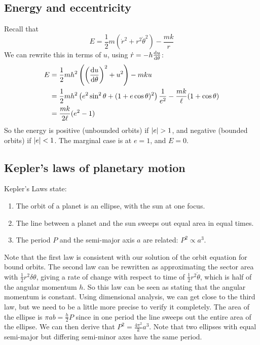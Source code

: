 \subsection{Energy and eccentricity}
Recall that
\[
	E = \frac{1}{2}m\left( \dot r^2 + r^2 \dot\theta^2 \right) - \frac{mk}{r}
\]
We can rewrite this in terms of \(u\), using \(\dot r = -h\dv{u}{\theta}\):
\begin{align*}
	E & = \frac{1}{2}mh^2\left( \left( \dv{u}{\theta} \right)^2 + u^2 \right) - mku                                      \\
	  & = \frac{1}{2}mh^2\left( e^2\sin^2\theta + (1+e\cos\theta)^2 \right)\frac{1}{e^2} - \frac{mk}{\ell}(1+\cos\theta) \\
	  & = \frac{mk}{2\ell}(e^2 - 1)
\end{align*}
So the energy is positive (unbounded orbits) if \(\abs{e} > 1\), and negative (bounded orbits) if \(\abs{e} < 1\).
The marginal case is at \(e = 1\), and \(E = 0\).

\subsection{Kepler's laws of planetary motion}
Kepler's Laws state:
\begin{enumerate}
	\item The orbit of a planet is an ellipse, with the sun at one focus.
	\item The line between a planet and the sun sweeps out equal area in equal times.
	\item The period \(P\) and the semi-major axis \(a\) are related: \(P^2 \propto a^3\).
\end{enumerate}
Note that the first law is consistent with our solution of the orbit equation for bound orbits.
The second law can be rewritten as approximating the sector area with \(\frac{1}{2}r^2\delta\theta\), giving a rate of change with respect to time of \(\frac{1}{2}r^2\dot\theta\), which is half of the angular momentum \(h\).
So this law can be seen as stating that the angular momentum is constant.
Using dimensional analysis, we can get close to the third law, but we need to be a little more precise to verify it completely.
The area of the ellipse is \(\pi a b = \frac{h}{2}P\) since in one period the line sweeps out the entire area of the ellipse.
We can then derive that \(P^2 = \frac{4\pi^2}{k}a^3\).
Note that two ellipses with equal semi-major but differing semi-minor axes have the same period.
